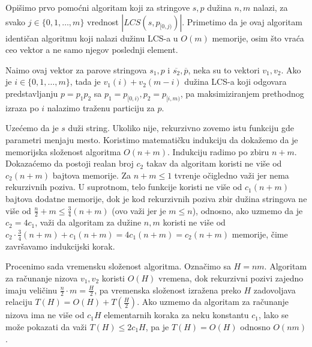 Opi\v simo prvo pomo\' cni algoritam koji za stringove $s,p$ du\v zina $n,m$ nalazi, za svako $j \in \{0, 1, \ldots, m\}$ vrednost $|LCS(s, p_{[0, j)})|$. Primetimo da je ovaj algoritam identi\v can algoritmu koji nalazi du\v zinu LCS-a u $O(m)$ memorije, osim \v sto vra\' ca ceo vektor a ne samo njegov poslednji element.



Na\dj imo ovaj vektor za parove stringova $s_1, p$ i $\overline{s_2}, \overline{p}$, neka su to vektori $v_1, v_2$. Ako je $i \in \{0, 1, \ldots, m\}$, tada je $v_1(i) + v_2(m-i)$ du\v zina LCS-a koji odgovara predstavljanju $p = p_1p_2$ sa $p_1 = p_{[0, i)}, p_2 = p_{[i, m)}$, pa maksimiziranjem prethodnog izraza po $i$ nalazimo tra\v zenu particiju za $p$.

\noindent
\begin{minipage}[l]{\textwidth}

\end{minipage}

Uze\' cemo da je $s$ du\v zi string. Ukoliko nije, rekurzivno zovemo istu funkciju gde parametri menjaju mesto. Koristimo matemati\v cku indukciju da doka\v zemo da je memorijska slo\v zenost algoritma $O(n+m)$. Indukciju radimo po zbiru $n+m$. Dokaza\' cemo da postoji realan broj $c_2$ takav da algoritam koristi ne vi\v se od $c_2(n+m)$ bajtova memorije. Za $n+m \leq 1$ tvr\dj enje o\v cigledno va\v zi jer nema rekurzivnih poziva. U suprotnom, telo funkcije koristi ne vi\v se od $c_1(n+m)$ bajtova dodatne memorije, dok je kod rekurzivnih poziva zbir du\v zina stringova ne vi\v se od $\frac{n}{2} + m \leq \frac{3}{4}(n+m)$ (ovo va\v zi jer je $m \leq n$), odnosno, ako uzmemo da je $c_2 = 4c_1$, va\v zi da algoritam za du\v zine $n,m$ koristi ne vi\v se od $c_2\cdot \frac{3}{4}(n+m) + c_1(n+m) = 4c_1(n+m) = c_2(n+m)$ memorije, \v cime zavr\v savamo indukcijski korak.

Procenimo sada vremensku slo\v zenost algoritma. Ozna\v cimo sa $H = nm$. Algoritam za ra\v cunanje nizova $v_1, v_2$ koristi $O(H)$ vremena, dok rekurzivni pozivi zajedno imaju veli\v cinu $\frac{n}{2}\cdot m = \frac{H}{2}$, pa vremenska slo\v zenost izra\v zena preko $H$ zadovoljava relaciju $T(H) = O(H) + T(\frac{H}{2})$. Ako uzmemo da algoritam za ra\v cunanje nizova ima ne vi\v se od $c_1H$ elementarnih koraka za neku konstantu $c_1$, lako se mo\v ze pokazati da va\v zi $T(H) \leq 2c_1H$, pa je $T(H) = O(H)$ odnosno $O(nm)$.

